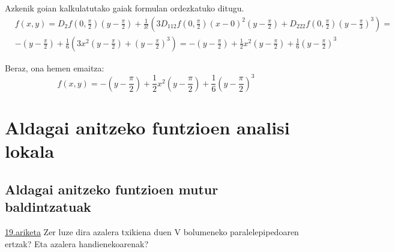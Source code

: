 Azkenik goian kalkulatutako gaiak formulan ordezkatuko ditugu.
\begin{align*}
    &f(x,y)=D_2f(0,\frac{\pi}{2})\left(y-\frac{\pi}{2}\right)+\frac{1}{3!}\left(3D_{112}f(0,\frac{\pi}{2})(x-0)^2(y-\frac{\pi}{2})+ D_{222}f(0,\frac{\pi}{2})(y-\frac{\pi}{3})^3 \right)=\\
    &-\left(y-\frac{\pi}{2}\right)+\frac{1}{6}\left(3x^2(y-\frac{\pi}{2})+(y-\frac{\pi}{2})^3\right)=-\left(y-\frac{\pi}{2}\right)+\frac{1}{2}x^2\left(y-\frac{\pi}{2}\right)+\frac{1}{6}\left(y-\frac{\pi}{2}\right)^3
\end{align*}


Beraz, ona hemen emaitza:
\begin{equation*}
    \boxed{f(x,y)=-\left(y-\frac{\pi}{2}\right)+\frac{1}{2}x^2\left(y-\frac{\pi}{2}\right)+\frac{1}{6}\left(y-\frac{\pi}{2}\right)^3}
\end{equation*}

\chapter{Aldagai anitzeko funtzioen analisi lokala}
\section{Aldagai anitzeko funtzioen mutur baldintzatuak}
\underline{19.ariketa} Zer luze dira azalera txikiena duen V bolumeneko paralelepipedoaren ertzak? Eta azalera handienekoarenak?

